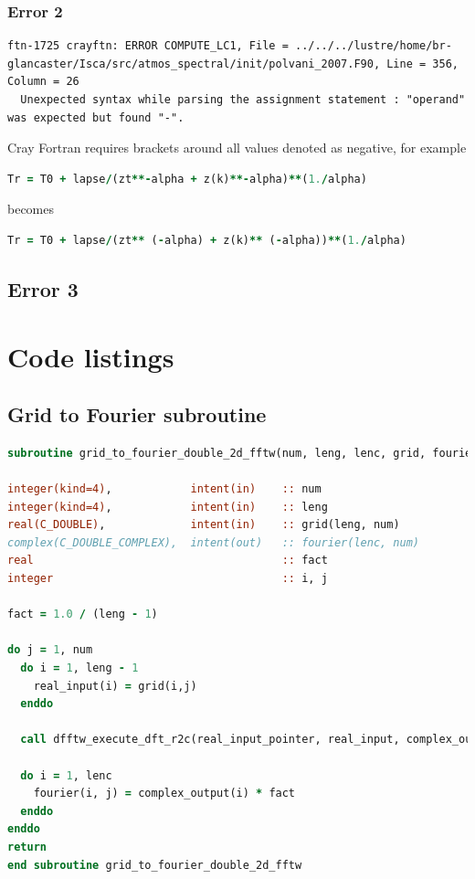 \documentclass[a4paper,11pt]{report}
\begin{document}
\subsection*{Error 2}

\begin{lstlisting}
ftn-1725 crayftn: ERROR COMPUTE_LC1, File = ../../../lustre/home/br-glancaster/Isca/src/atmos_spectral/init/polvani_2007.F90, Line = 356, Column = 26 
  Unexpected syntax while parsing the assignment statement : "operand" was expected but found "-".
\end{lstlisting}
Cray Fortran requires brackets around all values denoted as negative, for example
\begin{lstlisting}[language=Fortran]
Tr = T0 + lapse/(zt**-alpha + z(k)**-alpha)**(1./alpha)
\end{lstlisting}
becomes 
\begin{lstlisting}[language=Fortran]
Tr = T0 + lapse/(zt** (-alpha) + z(k)** (-alpha))**(1./alpha)
\end{lstlisting}

\section*{Error 3}



\chapter{Code listings}
\label{apdx:codelisting}

\section*{Grid to Fourier subroutine}

\begin{lstlisting}[language=Fortran,caption={Code used to perform an FFT using the FFTW library. This subroutine can be found in the new \texttt{fftw.F90} module, and transforms a 2D data structure from the spacial domain to frequency domain.}]
subroutine grid_to_fourier_double_2d_fftw(num, leng, lenc, grid, fourier)

integer(kind=4),            intent(in)    :: num    
integer(kind=4),            intent(in)    :: leng   
real(C_DOUBLE),             intent(in)    :: grid(leng, num)
complex(C_DOUBLE_COMPLEX),  intent(out)   :: fourier(lenc, num)
real                                      :: fact 
integer                                   :: i, j

fact = 1.0 / (leng - 1)

do j = 1, num
  do i = 1, leng - 1
    real_input(i) = grid(i,j)
  enddo

  call dfftw_execute_dft_r2c(real_input_pointer, real_input, complex_output)

  do i = 1, lenc
    fourier(i, j) = complex_output(i) * fact
  enddo
enddo
return
end subroutine grid_to_fourier_double_2d_fftw
\end{lstlisting}
\end{document}
